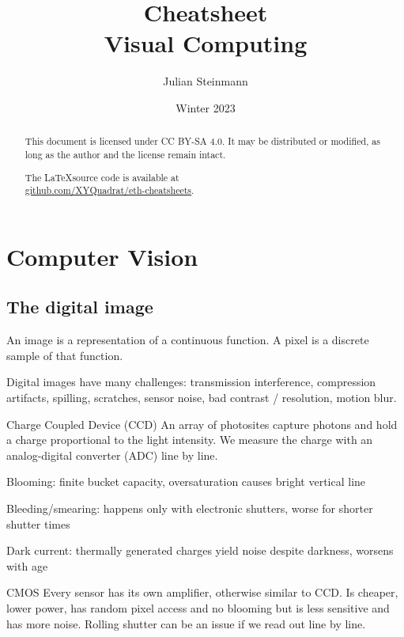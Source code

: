 \documentclass[a4paper,10pt]{article}
\title{Cheatsheet\\ Visual Computing}
\author{Julian Steinmann}
\date{\vspace{-10pt}Winter 2023}
\let\svitem\item
\newenvironment{citemize}[1][\relax]{\renewcommand\item[1][black]{\color{##1}\svitem}
  \ifx\relax#1\itemize\else\itemize[#1]\fi}{\enditemize}
\newcommand*\bad{\item[badred]}
\begin{document}
\maketitle

\renewcommand{\abstractname}{License}
\begin{abstract}
	This document is licensed under CC BY-SA 4.0. It may be distributed or modified, as long as the author and the license remain intact.

	\begin{center}
	    The \LaTeX source code is available at \\ \href{https://github.com/XYQuadrat/eth-cheatsheets}{\color{brandblue}github.com/XYQuadrat/eth-cheatsheets}.
	\end{center}
\end{abstract}

\section{Computer Vision}
\subsection{The digital image}
An image is a representation of a continuous function. A pixel is a discrete sample of that function.

Digital images have many challenges: transmission interference, compression artifacts, spilling, scratches, sensor noise, bad contrast / resolution, motion blur.

\begin{subbox}{Charge Coupled Device (CCD)}
    An array of photosites capture photons and hold a charge proportional to the light intensity.
    We measure the charge with an analog-digital converter (ADC) line by line.
    \begin{citemize}
        \bad Blooming: finite bucket capacity, oversaturation causes bright vertical line
        \bad Bleeding/smearing: happens only with electronic shutters, worse for shorter shutter times
        \bad Dark current: thermally generated charges yield noise despite darkness, worsens with age
    \end{citemize}
\end{subbox}

\begin{subbox}{CMOS}
    Every sensor has its own amplifier, otherwise similar to CCD.
    Is cheaper, lower power, has random pixel access and no blooming but is less sensitive and has more noise.
    Rolling shutter can be an issue if we read out line by line.
\end{subbox}
\end{document}

